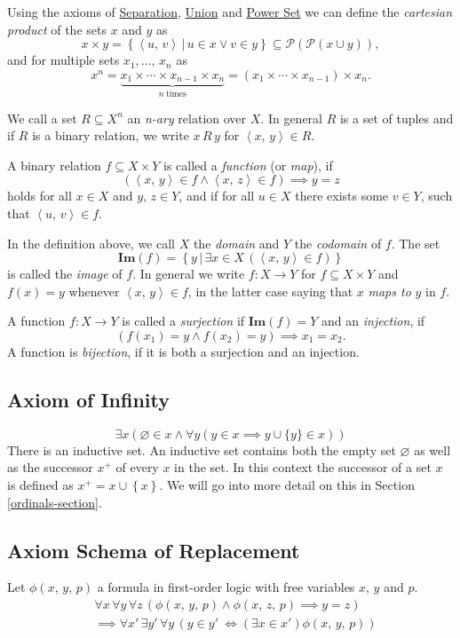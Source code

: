 \documentclass[../../main.tex]{subfiles}
\begin{document}
Using the axioms of \hyperref[ZF3]{Separation}, \hyperref[ZF5]{Union} and \hyperref[ZF6]{Power Set} we can define the \textit{cartesian product} of the sets $x$ and $y$ as
$$x \times y = \left\{\left<u,\, v\right> \,\vert\, u \in x \vee v \in y\right\} \subseteq \mathcal{P}\left(\mathcal{P}\left(x \cup y\right)\right),$$
and for multiple sets $x_1,\ldots,\, x_n$ as
$$x^n = \underbrace{x_1 \times \cdots \times x_{n-1} \times x_n}_{n\ \text{times}}  = \left(x_1 \times \cdots \times x_{n-1}\right) \times x_n.$$

We call a set $R \subseteq X^n$ an \textit{n-ary} relation over $X$.
In general $R$ is a set of tuples and if $R$ is a binary relation, we write $x\, R\, y$ for $\left<x,\, y\right> \in R$.

A binary relation $f \subseteq X \times Y$ is called a \textit{function} (or \textit{map}), if
$$\left(\left<x,\, y\right> \in f \wedge \left<x,\, z\right> \in f\right) \implies y = z$$
holds for all $x \in X$ and $y,\, z \in Y$, and if for all $u \in X$ there exists some $v \in Y$, such that $\left<u,\, v\right> \in f$.

In the definition above, we call $X$ the \textit{domain} and $Y$ the \textit{codomain} of $f$.
The set
$$\mathbf{Im}(f) = \left\{y \,\vert\, \exists x \in X \, \left(\left<x,\, y\right> \in f\right)\right\}$$
is called the \textit{image} of $f$. 
In general we write $f: X \to Y$ for $f \subseteq X \times Y$ and $f(x) = y$ whenever $\left<x,\, y\right> \in f$, in the latter case saying that $x$ \textit{maps to} $y$ in $f$.

A function $f: X \to Y$ is called a \textit{surjection} if $\mathbf{Im}(f) = Y$
and an \textit{injection}, if $$\left(f(x_1) = y \wedge f(x_2) = y\right) \implies x_1 = x_2.$$ 
A function is \textit{bijection}, if it is both a surjection and an injection. \cite[pp.7-10]{Jec78}

\subsection{Axiom of Infinity} \label{ZF7}
$$\exists x \left(\varnothing \in x \wedge \forall y \left(y \in x \implies y \cup \{y\} \in x \right)\right)$$
There is an inductive set.
An inductive set contains both the empty set $\varnothing$ as well as the successor $x^+$ of every $x$ in the set.
In this context the successor of a set $x$ is defined as $x^+ = x \cup \left\{x\right\}$.
We will go into more detail on this in Section \ref{ordinals-section}.

\subsection{Axiom Schema of Replacement}\label{ZF8}
Let $\phi(x,\, y,\, p)$ a formula in first-order logic with free variables $x$, $y$ and $p$.
\begin{align}\label{replacement-axiom}
    &\forall x\, \forall y\, \forall z\, \left(\phi(x,\, y,\, p) \wedge \phi(x,\, z,\, p) \implies y = z\right)\nonumber \\
    &\implies \forall x'\, \exists y'\, \forall y\, \left(y \in y'\ \iff \left(\exists x \in x'\right) \phi(x,\, y,\, p)\right)
\end{align}
\end{document}
